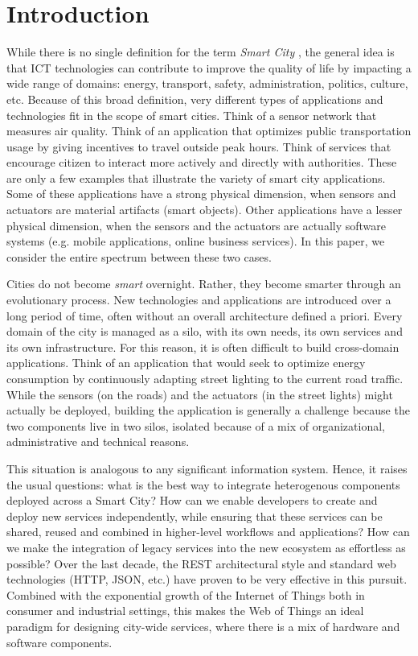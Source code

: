 \section{Introduction}

While there is no single definition for the term \emph{Smart City} \cite{caragliu2011smart,batty2012smart,shapiro2006smart}, the general idea is that ICT technologies can contribute to improve the quality of life by impacting a wide range of domains: energy, transport, safety, administration, politics, culture, etc. Because of this broad definition, very different types of applications and technologies fit in the scope of smart cities. Think of a sensor network that measures air quality. Think of an application that optimizes public transportation usage by giving incentives to travel outside peak hours. Think of services that encourage citizen to interact more actively and directly with authorities. These are only a few examples that illustrate the variety of smart city applications. Some of these applications have a strong physical dimension, when sensors and actuators are material artifacts (smart objects). Other applications have a lesser physical dimension, when the sensors and the actuators are actually software systems (e.g. mobile applications, online business services). In this paper, we consider the entire spectrum between these two cases.

Cities do not become \emph{smart} overnight. Rather, they become smarter through an evolutionary process. New technologies and applications are introduced over a long period of time, often without an overall architecture defined a priori. Every domain of the city is managed as a silo, with its own needs, its own services and its own infrastructure. For this reason, it is often difficult to build cross-domain applications. Think of an application that would seek to optimize energy consumption by continuously adapting street lighting to the current road traffic. While the sensors (on the roads) and the actuators (in the street lights) might actually be deployed, building the application is generally a challenge because the two components live in two silos, isolated because of a mix of organizational, administrative and technical reasons.

This situation is analogous to any significant information system. Hence, it raises the usual questions: what is the best way to integrate heterogenous components deployed across a Smart City? How can we enable developers to create and deploy new services independently, while ensuring that these services can be shared, reused and combined in higher-level workflows and applications? How can we make the integration of legacy services into the new ecosystem as effortless as possible? Over the last decade, the REST architectural style and standard web technologies (HTTP, JSON, etc.) have proven to be very effective in this pursuit. Combined with the exponential growth of the Internet of Things both in consumer and industrial settings, this makes the Web of Things \cite{Guinard2009} an ideal paradigm for designing city-wide services, where there is a mix of hardware and software components.


